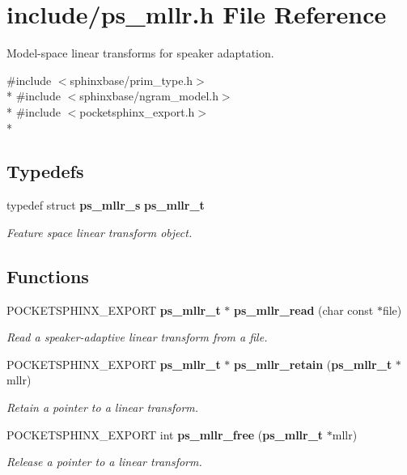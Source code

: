 \section{include/ps\-\_\-mllr.h File Reference}
\label{ps__mllr_8h}


Model-\/space linear transforms for speaker adaptation.  


{\ttfamily \#include $<$sphinxbase/prim\-\_\-type.\-h$>$}\\*
{\ttfamily \#include $<$sphinxbase/ngram\-\_\-model.\-h$>$}\\*
{\ttfamily \#include $<$pocketsphinx\-\_\-export.\-h$>$}\\*
\subsection*{Typedefs}
\begin{DoxyCompactItemize}
\item 
typedef struct {\bf ps\-\_\-mllr\-\_\-s} {\bf ps\-\_\-mllr\-\_\-t}\label{ps__mllr_8h_ad4b6bf4c3cb6a671f79f1d709857d5b1}

\begin{DoxyCompactList}\small\item\em Feature space linear transform object. \end{DoxyCompactList}\end{DoxyCompactItemize}
\subsection*{Functions}
\begin{DoxyCompactItemize}
\item 
P\-O\-C\-K\-E\-T\-S\-P\-H\-I\-N\-X\-\_\-\-E\-X\-P\-O\-R\-T {\bf ps\-\_\-mllr\-\_\-t} $\ast$ {\bf ps\-\_\-mllr\-\_\-read} (char const $\ast$file)\label{ps__mllr_8h_a05d268b1d79a1be2ae96093c96aad79d}

\begin{DoxyCompactList}\small\item\em Read a speaker-\/adaptive linear transform from a file. \end{DoxyCompactList}\item 
P\-O\-C\-K\-E\-T\-S\-P\-H\-I\-N\-X\-\_\-\-E\-X\-P\-O\-R\-T {\bf ps\-\_\-mllr\-\_\-t} $\ast$ {\bf ps\-\_\-mllr\-\_\-retain} ({\bf ps\-\_\-mllr\-\_\-t} $\ast$mllr)\label{ps__mllr_8h_a2f40deff6976bf03a845aa474494edfb}

\begin{DoxyCompactList}\small\item\em Retain a pointer to a linear transform. \end{DoxyCompactList}\item 
P\-O\-C\-K\-E\-T\-S\-P\-H\-I\-N\-X\-\_\-\-E\-X\-P\-O\-R\-T int {\bf ps\-\_\-mllr\-\_\-free} ({\bf ps\-\_\-mllr\-\_\-t} $\ast$mllr)\label{ps__mllr_8h_ae56a8c52dd7513b1883536f2a729e1d0}

\begin{DoxyCompactList}\small\item\em Release a pointer to a linear transform. \end{DoxyCompactList}\end{DoxyCompactItemize}


